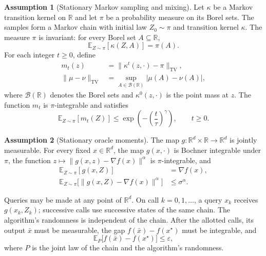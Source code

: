 \documentclass[10pt]{article}
\theoremstyle{definition}
\newtheorem{assumption}{Assumption}
\begin{document}
\begin{assumption}[Stationary Markov sampling and mixing]
Let $\kappa$ be a Markov transition kernel on $\mathbb{R}$ and let $\pi$ be a probability measure on its Borel sets. The samples form a Markov chain with initial law $Z_0\sim\pi$ and transition kernel $\kappa$. The measure $\pi$ is invariant: for every Borel set $A\subseteq\mathbb{R}$,
\[
\mathbb{E}_{Z\sim\pi}[\kappa(Z,A)]=\pi(A).
\]
For each integer $t\geq 0$, define
\[
\begin{aligned}
m_t(z)&=\|\kappa^t(z,\cdot)-\pi\|_{\mathrm{TV}},\\
\|\mu-\nu\|_{\mathrm{TV}}
&=\sup_{A\in\mathcal{B}(\mathbb{R})}|\mu(A)-\nu(A)|,
\end{aligned}
\]
where $\mathcal{B}(\mathbb{R})$ denotes the Borel sets and $\kappa^0(z,\cdot)$ is the point mass at $z$. The function $m_t$ is $\pi$-integrable and satisfies
\[
\mathbb{E}_{Z\sim\pi}[m_t(Z)]
\leq \exp\!\left(-\left(\frac{t}{\tau}\right)^\gamma\right),
\qquad t\geq 0.
\]
\end{assumption}

\begin{assumption}[Stationary oracle moments]
The map $g:\mathbb{R}^d\times\mathbb{R}\to\mathbb{R}^d$ is jointly measurable. For every fixed $x\in\mathbb{R}^d$, the map $g(x,\cdot)$ is Bochner integrable under $\pi$, the function $z\mapsto\|g(x,z)-\nabla f(x)\|^\alpha$ is $\pi$-integrable, and
\[
\begin{aligned}
\mathbb{E}_{Z\sim\pi}[g(x,Z)]&=\nabla f(x),\\
\mathbb{E}_{Z\sim\pi}
\bigl[\|g(x,Z)-\nabla f(x)\|^\alpha\bigr]
&\leq\sigma^\alpha.
\end{aligned}
\]
\end{assumption}

Queries may be made at any point of $\mathbb{R}^d$. On call $k=0,1,\ldots$, a query $x_k$ receives $g(x_k,Z_k)$; successive calls use successive states of the same chain. The algorithm's randomness is independent of the chain. After the allotted calls, its output $\bar{x}$ must be measurable, the gap $f(\bar{x})-f(x^\star)$ must be integrable, and
\[
\mathbb{E}_{P}\bigl[f(\bar{x})-f(x^\star)\bigr]
\leq\varepsilon,
\]
where $P$ is the joint law of the chain and the algorithm's randomness.
\end{document}
